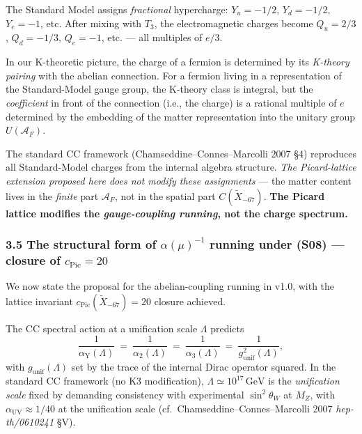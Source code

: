 \documentclass[
  11pt,
  a4paper,
]{article}
\begin{document}
The Standard Model assigns \emph{fractional} hypercharge: \(Y_u = -1/2\), \(Y_d = -1/2\), \(Y_e = -1\), etc. After mixing with \(T_3\), the electromagnetic charges become \(Q_u = 2/3\), \(Q_d = -1/3\), \(Q_e = -1\), etc. --- all multiples of \(e/3\).

In our K-theoretic picture, the charge of a fermion is determined by its \emph{K-theory pairing} with the abelian connection. For a fermion living in a representation of the Standard-Model gauge group, the K-theory class is integral, but the \emph{coefficient} in front of the connection (i.e., the charge) is a rational multiple of \(e\) determined by the embedding of the matter representation into the unitary group \(U(\mathcal A_F)\).

The standard CC framework (Chamseddine--Connes--Marcolli 2007 §4) reproduces all Standard-Model charges from the internal algebra structure. \emph{The Picard-lattice extension proposed here does not modify these assignments} --- the matter content lives in the \emph{finite} part \(\mathcal A_F\), not in the spatial part \(C(\tilde X_{-67})\). \textbf{The Picard lattice modifies the \emph{gauge-coupling running}, not the charge spectrum.}

\hypertarget{the-structural-form-of-alphamu-1-running-under-s08-closure-of-c_mathrmpic-20}{%
\subsubsection{\texorpdfstring{3.5 The structural form of \(\alpha(\mu)^{-1}\) running under (S08) --- closure of \(c_{\mathrm{Pic}} = 20\)}{3.5 The structural form of \textbackslash alpha(\textbackslash mu)\^{}\{-1\} running under (S08) --- closure of c\_\{\textbackslash mathrm\{Pic\}\} = 20}}\label{the-structural-form-of-alphamu-1-running-under-s08-closure-of-c_mathrmpic-20}}

We now state the proposal for the abelian-coupling running in v1.0, with the lattice invariant \(c_{\mathrm{Pic}}(\tilde X_{-67}) = 20\) closure achieved.

The CC spectral action at a unification scale \(\Lambda\) predicts
\[
\frac{1}{\alpha_{\mathrm Y}(\Lambda)}\ =\ \frac{1}{\alpha_2(\Lambda)}\ =\ \frac{1}{\alpha_3(\Lambda)}\ =\ \frac{1}{g_{\mathrm{unif}}^2(\Lambda)},
\]
with \(g_{\mathrm{unif}}(\Lambda)\) set by the trace of the internal Dirac operator squared. In the standard CC framework (no K3 modification), \(\Lambda \simeq 10^{17}\,\mathrm{GeV}\) is the \emph{unification scale} fixed by demanding consistency with experimental \(\sin^2 \theta_W\) at \(M_Z\), with \(\alpha_{\mathrm{UV}} \approx 1/40\) at the unification scale (cf.~Chamseddine--Connes--Marcolli 2007 \emph{hep-th/0610241} §V).
\end{document}
